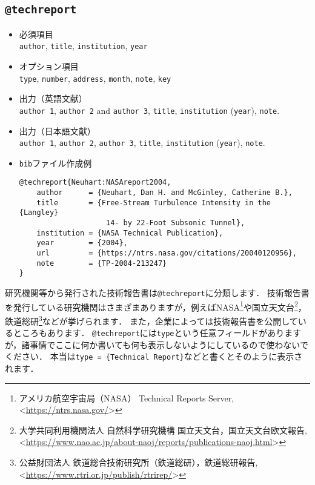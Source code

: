 \documentclass[a4paper,fleqn,uplatex,dvipdfmx]{jsarticle}
\makeatletter
\newcommand{\tttechreport}{\texttt{@techreport}}
\makeatother
\begin{document}
\subsection{\tttechreport}
\label{ssec:techreport}
\begin{screen}
    \begin{itemize}
        \item 必須項目 \\
        \verb|author|, \verb|title|, \verb|institution|, \verb|year|
        \item オプション項目 \\
        \verb|type|, \verb|number|, \verb|address|, \verb|month|, \verb|note|, \verb|key|
        \item 出力（英語文献） \\
            \colorbox[gray]{0.8}{\texttt{author 1}}, \colorbox[gray]{0.8}{\texttt{author 2}} and \colorbox[gray]{0.8}{\texttt{author 3}}, \colorbox[gray]{0.8}{\texttt{title}}, \colorbox[gray]{0.8}{\texttt{institution}} (\colorbox[gray]{0.8}{\texttt{year}}), \colorbox[gray]{0.8}{\texttt{note}}.
        \item 出力（日本語文献） \\
            \colorbox[gray]{0.8}{\texttt{author 1}}, \colorbox[gray]{0.8}{\texttt{author 2}}, \colorbox[gray]{0.8}{\texttt{author 3}}, \colorbox[gray]{0.8}{\texttt{title}}, \colorbox[gray]{0.8}{\texttt{institution}} (\colorbox[gray]{0.8}{\texttt{year}}), \colorbox[gray]{0.8}{\texttt{note}}.
        \item \verb|bib|ファイル作成例 \vspace{-3mm}
\begin{verbatim}
@techreport{Neuhart:NASAreport2004,
    author      = {Neuhart, Dan H. and McGinley, Catherine B.},
    title       = {Free-Stream Turbulence Intensity in the {Langley} 
                    14- by 22-Foot Subsonic Tunnel},
    institution = {NASA Technical Publication},
    year        = {2004},
    url         = {https://ntrs.nasa.gov/citations/20040120956},
    note        = {TP-2004-213247}
}
\end{verbatim}
    \end{itemize}
\end{screen}

研究機関等から発行された技術報告書は\tttechreport に分類します．
技術報告書を発行している研究機関はさまざまありますが，例えばNASA\footnote{アメリカ航空宇宙局（NASA） Technical Reports Server, \textless\url{https://ntrs.nasa.gov/}\textgreater}や国立天文台\footnote{大学共同利用機関法人 自然科学研究機構 国立天文台，国立天文台欧文報告, \textless\url{https://www.nao.ac.jp/about-naoj/reports/publications-naoj.html}\textgreater}，鉄道総研\footnote{公益財団法人 鉄道総合技術研究所（鉄道総研），鉄道総研報告, \textless\url{https://www.rtri.or.jp/publish/rtrirep/}\textgreater}などが挙げられます．
また，企業によっては技術報告書を公開しているところもあります．
\tttechreport には\verb|type|という任意フィールドがありますが，諸事情でここに何か書いても何も表示しないようにしているので使わないでください．
本当は\verb|type = {Technical Report}|などと書くとそのように表示されます．
\end{document}
